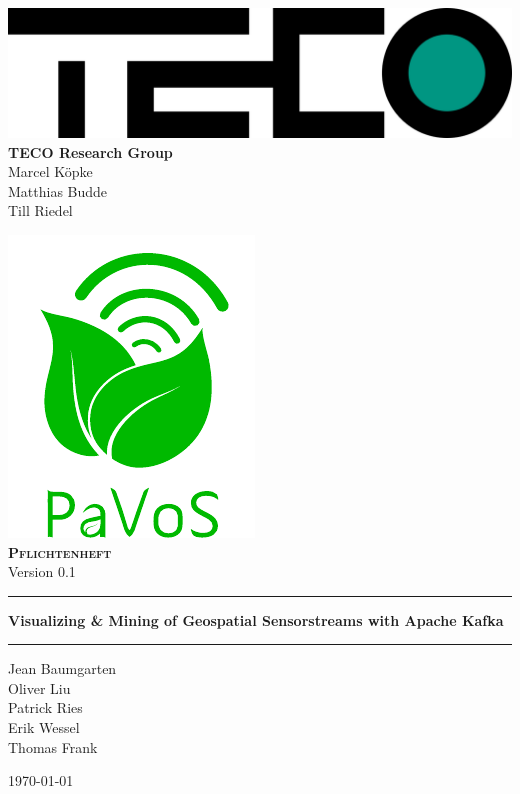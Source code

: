 \begin{titlepage}
	\begin{center}
	\includegraphics[width=0.5\linewidth]{images/TECOLogo.png}\\[0.2cm]

	\textbf{TECO Research Group}\\[0.2cm]
	Marcel Köpke\\Matthias Budde\\Till Riedel\\
	\vspace{1cm}
	
	\includegraphics[width=0.33\linewidth]{images/PaVoSLogo-Erweitert}\\[1cm]
	
	\textsc{\textbf{\LARGE Pflichtenheft}}\\
	{\small Version 0.1}\\
	
	\vspace{1cm}\hrule\vspace{0.4cm}
	\textbf{\huge Visualizing \& Mining of Geospatial Sensorstreams with Apache Kafka}\\
	\vspace{0.4cm}\hrule\vspace{1cm}
	
	{\Large Jean Baumgarten\\
	Oliver Liu\\
	Patrick Ries\\
	Erik Wessel\\
	Thomas Frank\\}

	\vspace{1cm}
	\today
	
	\end{center}
\end{titlepage}
